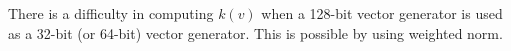 \documentclass{svmult}
\def\bbf2{\ifmmode \mathbb{F}_2 \else $\mathbb{F}_2$ \fi}
\begin{document}
There is a difficulty in computing $k(v)$ when 
a 128-bit vector generator is used as a 32-bit 
(or 64-bit) vector generator. This is possible by
using weighted norm.\cite{SFMT}\cite{thesis:saito}



\end{document}

